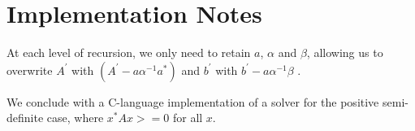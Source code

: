 \documentclass{article}
\begin{document}
\section{Implementation Notes}
At each level of recursion, we only need to retain
\begin{math}{}a\end{math},
\begin{math}{}\alpha\end{math}
and
\begin{math}{}\beta\end{math}, allowing us to overwrite
\begin{math}{}A^{'}\end{math}
with \begin{math}{}(A^{'} - a\alpha^{-1}a^*)\end{math}
and
\begin{math}{}b^{'}\end{math} with
\begin{math}{}b^{'}-a\alpha^{-1}\beta\end{math}
.

We conclude with a C-language implementation of a solver for the positive semi-definite case, where
\begin{math}{}x^*Ax >=0 \end{math} for all \begin{math}{}x\end{math}.
\end{document}
